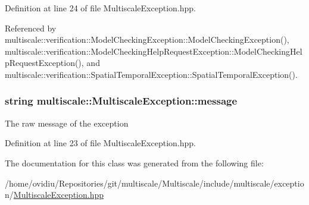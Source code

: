 Definition at line 24 of file Multiscale\-Exception.\-hpp.



Referenced by multiscale\-::verification\-::\-Model\-Checking\-Exception\-::\-Model\-Checking\-Exception(), multiscale\-::verification\-::\-Model\-Checking\-Help\-Request\-Exception\-::\-Model\-Checking\-Help\-Request\-Exception(), and multiscale\-::verification\-::\-Spatial\-Temporal\-Exception\-::\-Spatial\-Temporal\-Exception().

\hypertarget{classmultiscale_1_1MultiscaleException_ad33583bafdf81f924849362ddbc89566}{
\subsubsection[{message}]{\setlength{\rightskip}{0pt plus 5cm}string multiscale\-::\-Multiscale\-Exception\-::message\hspace{0.3cm}{\ttfamily [protected]}}}\label{classmultiscale_1_1MultiscaleException_ad33583bafdf81f924849362ddbc89566}
The raw message of the exception 

Definition at line 23 of file Multiscale\-Exception.\-hpp.



The documentation for this class was generated from the following file\-:\begin{DoxyCompactItemize}
\item 
/home/ovidiu/\-Repositories/git/multiscale/\-Multiscale/include/multiscale/exception/\hyperlink{MultiscaleException_8hpp}{Multiscale\-Exception.\-hpp}\end{DoxyCompactItemize}
